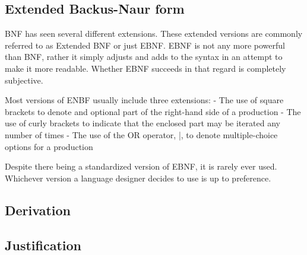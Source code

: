 \subsection{Extended Backus-Naur form}

BNF has seen several different extensions.
These extended versions are commonly referred to as Extended BNF or just EBNF. 
EBNF is not any more powerful than BNF, rather it simply adjusts and adds to the syntax in an attempt to make it more readable.
Whether EBNF succeeds in that regard is completely subjective. 

Most versions of ENBF usually include three extensions:
- The use of square brackets to denote and optional part of the right-hand side of a production
- The use of curly brackets to indicate that the enclosed part may be iterated any number of times
- The use of the OR operator, |, to denote multiple-choice options for a production

Despite there being a standardized version of EBNF, it is rarely ever used. 
Whichever version a language designer decides to use is up to preference.

\subsection{Derivation}


\subsection{Justification}
